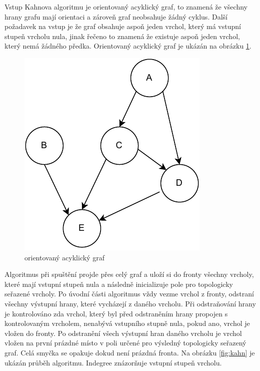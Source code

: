 \documentclass[12pt]{report}
\begin{document}
	Vstup Kahnova algoritmu je orientovaný acyklický graf, to znamená že všechny hrany grafu mají orientaci a zároveň graf neobsahuje žádný cyklus. Další požadavek na vstup je že graf obsahuje aspoň jeden vrchol, který má vstupní stupeň vrcholu nula, jinak řečeno to znamená že existuje aspoň jeden vrchol, který nemá žádného předka. Orientovaný acyklický graf je ukázán na obrázku \ref{fig:dag}. 
	
	\begin{figure}[h]
		\centering
		\includegraphics[width=.3\textwidth]{img/dag}
		\caption{orientovaný acyklický graf}
		\label{fig:dag}
	\end{figure}

	Algoritmus při spuštění projde přes celý graf a uloží si do fronty všechny vrcholy, které mají vstupní stupeň nula a následně inicializuje pole pro topologicky seřazené vrcholy. Po úvodní části algoritmus vždy vezme vrchol z fronty, odstraní všechny výstupní hrany, které vycházejí z daného vrcholu. Při odstraňování hrany je kontrolováno zda vrchol, který byl před odstraněním hrany propojen s kontrolovaným vrcholem, nenabývá vstupního stupně nula, pokud ano, vrchol je vložen do fronty. Po odstranění všech výstupní hran daného vrcholu je vrchol vložen na první prázdné místo v poli určené pro výsledný topologicky seřazený graf. Celá smyčka se opakuje dokud není prázdná fronta. Na obrázku \ref{fig:kahn} je ukázán průběh algoritmu. Indegree znázorňuje vstupní stupeň vrcholu.
	
	\newpage
	
\end{document}
